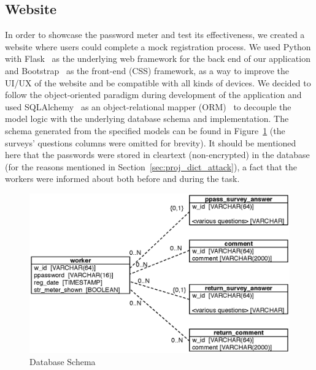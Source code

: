   \subsection{Website}
  \label{ssec:website}
    In order to showcase the password meter and test its effectiveness, we created a website where users could complete a mock registration process. We used Python with Flask~\cite{python_flask} as the underlying web framework for the back end of our application and Bootstrap~\cite{bootstrap} as the front-end (CSS) framework, as a way to improve the UI/UX of the website and be compatible with all kinds of devices. We decided to follow the object-oriented paradigm during development of the application and used SQLAlchemy~\cite{sqlalchemy} as an object-relational mapper (ORM)~\cite{orm_edm} to decouple the model logic with the underlying database schema and implementation. The schema generated from the specified models can be found in Figure~\ref{fig:db-schema} (the surveys' questions columns were omitted for brevity). It should be mentioned here that the passwords were stored in cleartext (non-encrypted) in the database (for the reasons mentioned in Section~\ref{sec:proj_dict_attack}), a fact that the workers were informed about both before and during the task.

    \begin{figure}[htpb]
      \centering
      \includegraphics[width=\textwidth]{Images/db_schema}
      \caption{Database Schema}
      \label{fig:db-schema}
    \end{figure}

